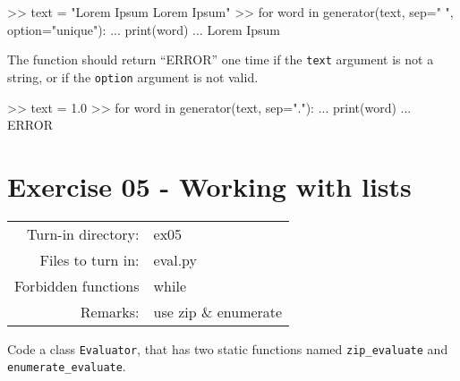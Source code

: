 \documentclass[]{article}
\newenvironment{Shaded}{\begin{snugshade}}{\end{snugshade}}
\newcommand{\BuiltInTok}[1]{\textcolor[rgb]{0.50,0.55,0.55}{#1}}
\newcommand{\ControlFlowTok}[1]{\textcolor[rgb]{0.99,0.74,0.29}{#1}}
\newcommand{\FloatTok}[1]{\textcolor[rgb]{0.96,0.45,0.00}{#1}}
\newcommand{\KeywordTok}[1]{\textcolor[rgb]{0.81,0.81,0.76}{#1}}
\newcommand{\NormalTok}[1]{\textcolor[rgb]{0.81,0.81,0.76}{#1}}
\newcommand{\OperatorTok}[1]{\textcolor[rgb]{0.81,0.81,0.76}{#1}}
\newcommand{\StringTok}[1]{\textcolor[rgb]{0.96,0.31,0.31}{#1}}
\begin{document}
\begin{Shaded}
\begin{Highlighting}[]
\OperatorTok{>>}\NormalTok{ text }\OperatorTok{=} \StringTok{"Lorem Ipsum Lorem Ipsum"}
\OperatorTok{>>} \ControlFlowTok{for}\NormalTok{ word }\KeywordTok{in}\NormalTok{ generator(text, sep}\OperatorTok{=}\StringTok{" "}\NormalTok{, option}\OperatorTok{=}\StringTok{"unique"}\NormalTok{):}
\NormalTok{...     }\BuiltInTok{print}\NormalTok{(word)}
\NormalTok{...}
\NormalTok{Lorem}
\NormalTok{Ipsum}
\end{Highlighting}
\end{Shaded}

The function should return ``ERROR'' one time if the \texttt{text}
argument is not a string, or if the \texttt{option} argument is not
valid.

\begin{Shaded}
\begin{Highlighting}[]
\OperatorTok{>>}\NormalTok{ text }\OperatorTok{=} \FloatTok{1.0}
\OperatorTok{>>} \ControlFlowTok{for}\NormalTok{ word }\KeywordTok{in}\NormalTok{ generator(text, sep}\OperatorTok{=}\StringTok{"."}\NormalTok{):}
\NormalTok{...     }\BuiltInTok{print}\NormalTok{(word)}
\NormalTok{...}
\NormalTok{ERROR}
\end{Highlighting}
\end{Shaded}

\hypertarget{section-1}{%
\section{}\label{section-1}}

\clearpage

\hypertarget{exercise-05---working-with-lists-1}{%
\section{Exercise 05 - Working with
lists}\label{exercise-05---working-with-lists-1}}

\begin{longtable}[]{@{}rl@{}}
\toprule
\endhead
Turn-in directory: & ex05\tabularnewline
Files to turn in: & eval.py\tabularnewline
Forbidden functions & while\tabularnewline
Remarks: & use zip \& enumerate\tabularnewline
\bottomrule
\end{longtable}

Code a class \texttt{Evaluator}, that has two static functions named
\texttt{zip\_evaluate} and \texttt{enumerate\_evaluate}.
\end{document}
